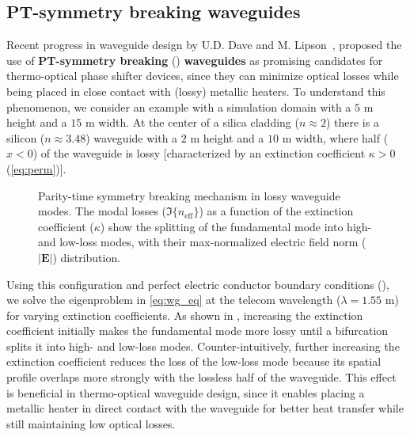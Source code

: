  \subsection*{PT-symmetry breaking waveguides}
 Recent progress in waveguide design by U.D. Dave and M. Lipson~\cite{lipson}, proposed the use of \textbf{PT-symmetry breaking} () \textbf{waveguides} as promising candidates for
 thermo-optical phase shifter devices, since they can minimize optical losses while being placed in close contact with (lossy) metallic heaters. To understand this phenomenon, we consider an example with a 
 simulation domain with a $5$ \textmu m height and a $15$ \textmu m width. At the center of a silica cladding ($n\approx 2$) there is a silicon ($n \approx 3.48$) waveguide with a $2$ \textmu m height and 
 a $10$ \textmu m width, where half ($x<0$) of the waveguide is lossy [characterized by an extinction coefficient $\kappa>0$ (\eqref{eq:perm})].

\begin{figure}[tb]
    \centering
    \caption{Parity-time symmetry breaking mechanism in lossy waveguide modes. The modal losses ($\Im\{n_\text{eff}\}$) as a function of the extinction coefficient ($\kappa$) show the splitting of the fundamental mode into 
    high- and low-loss modes, with their max-normalized electric field norm ($\vert \mathbf{E} \vert$) distribution.}
    \label{fig:pt}
\end{figure}

Using this configuration and perfect electric conductor boundary conditions (), we solve the eigenproblem in \eqref{eq:wg_eq} at the telecom wavelength ($\lambda = 1.55$ \textmu m) for varying extinction coefficients. 
 As shown in , increasing the extinction coefficient initially makes the fundamental mode more lossy until a bifurcation splits
  it into high- and low-loss modes. Counter-intuitively, further increasing the extinction coefficient reduces the loss of the low-loss mode 
  because its spatial profile overlaps more strongly with the lossless half of the waveguide.
   This effect is beneficial in thermo-optical waveguide design, since it enables placing a metallic heater in direct contact with the waveguide for better heat transfer while still
    maintaining low optical losses.

